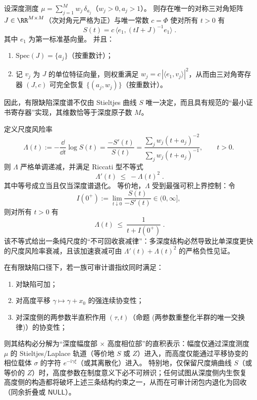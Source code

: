 \begin{proposition}
设深度测度 \(\mu=\sum_{j=1}^{M} w_j\,\delta_{a_j}\)（\(w_j>0,a_j>1\)）。
则存在唯一的对称三对角矩阵 \(J\in\RR^{M\times M}\)（次对角元严格为正）与唯一常数 \(c=\Phi\) 使对所有 \(t>0\) 有
\[
\boxed{\;
S(t)=c\,\langle e_1,(tI+J)^{-1}e_1\rangle\; }.
\]
其中 \(e_1\) 为第一标准基向量。
并且：
\begin{enumerate}
  \item \( \mathrm{Spec}(J)=\{a_j\}\)（按重数计）；
  \item 记 \(v_j\) 为 \(J\) 的单位特征向量，则权重满足 \(w_j=c\,|\langle e_1,v_j\rangle|^2\)，从而由三对角寄存器 \((J,c)\) 可完全恢复 \(\{(a_j,w_j)\}\)（按重数计）。
\end{enumerate}
因此，有限缺陷深度谱不仅由 Stieltjes 曲线 \(S\) 唯一决定，而且具有规范的“最小证书寄存器”实现，其维数恰等于深度原子数 \(M\)。
\end{proposition}

\begin{proposition}[风险率 Riccati 不等式：\texorpdfstring{$\Lambda(t):=-S'(t)/S(t)$}{Lambda(t)} 的强衰减与退化刻画]
定义尺度风险率
\[
\Lambda(t):=-\frac{\dd}{\dd t}\log S(t)=\frac{-S'(t)}{S(t)}
=\frac{\sum_{j} w_j(t+a_j)^{-2}}{\sum_{j} w_j(t+a_j)^{-1}},
\qquad t>0.
\]
则 \(\Lambda\) 严格单调递减，并满足 Riccati 型不等式
\[
\boxed{\;
\Lambda'(t)\ \le\ -\Lambda(t)^2\; }.
\]
其中等号成立当且仅当深度谱退化。
等价地，\(\Lambda\) 受到最强可积上界控制：令
\[
I(0^+):=\lim_{t\downarrow 0}\frac{S(t)}{-S'(t)}\in(0,\infty],
\]
则对所有 \(t>0\) 有
\[
\boxed{\;
\Lambda(t)\ \le\ \frac{1}{t+I(0^+)}\; }.
\]
该不等式给出一条纯尺度的“不可回收衰减律”：多深度结构必然导致比单深度更快的尺度风险率衰减，且该加速衰减可由 \(\Lambda'(t)+\Lambda(t)^2\) 的严格负性见证。
\end{proposition}





\begin{proposition}
在有限缺陷口径下，若一族可审计谱指纹同时满足：
\begin{enumerate}
  \item 对缺陷可加；
  \item 对高度平移 \(\gamma\mapsto\gamma+x_0\) 的强连续协变性；
  \item 对深度侧的两参数半直积作用 \((\tau,t)\)（命题  \textup{(}两参数重整化半群的唯一交换律\textup{)}）的协变性；
\end{enumerate}
则其结构必分解为“深度幅度部 \(\times\) 高度相位部”的直积表示：幅度仅通过深度测度 \(\mu\) 的 Stieltjes/Laplace 轨道（等价地 \(S\) 或 \(Z\)）进入，而高度仅能通过平移协变的相位载体 \(\sigma\) 的字符 \(e^{-\mathrm{i}\gamma\xi}\)（或其离散化）进入。
特别地，仅保留尺度熵曲线 \(S\)（或等价的 \(Z\)）时，高度参数在制度意义下必不可辨识；任何试图从深度侧内生恢复高度侧的构造都将破坏上述三条结构约束之一，从而在可审计闭包内退化为回收（同余折叠或 \(\mathsf{NULL}\)）。
\end{proposition}

\endinput
